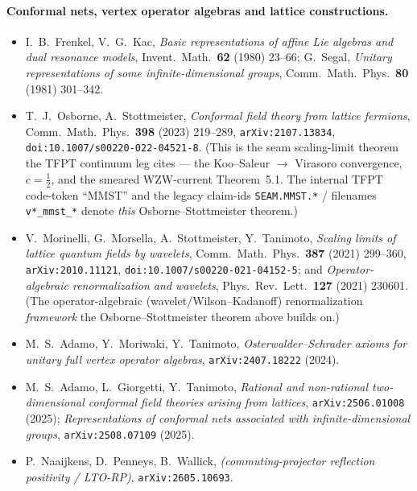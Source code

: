 \paragraph{Conformal nets, vertex operator algebras and lattice constructions.}
\begin{itemize}\setlength\itemsep{1.5pt}
\item I.~B.~Frenkel, V.~G.~Kac, \textit{Basic representations of affine Lie algebras and
  dual resonance models}, Invent.\ Math.\ \textbf{62} (1980) 23--66; G.~Segal,
  \textit{Unitary representations of some infinite-dimensional groups}, Comm.\ Math.\ Phys.\
  \textbf{80} (1981) 301--342.
\item T.~J.~Osborne, A.~Stottmeister, \textit{Conformal field theory from lattice
  fermions}, Comm.\ Math.\ Phys.\ \textbf{398} (2023) 219--289,
  \texttt{arXiv:2107.13834}, \texttt{doi:10.1007/s00220-022-04521-8}.  (This is the
  seam scaling-limit theorem the TFPT continuum leg cites --- the Koo--Saleur $\to$
  Virasoro convergence, $c=\tfrac12$, and the smeared WZW-current Theorem~5.1.  The
  internal TFPT code-token ``MMST'' and the legacy claim-ids \texttt{SEAM.MMST.*} /
  filenames \texttt{v*\_mmst\_*} denote \emph{this} Osborne--Stottmeister theorem.)
\item V.~Morinelli, G.~Morsella, A.~Stottmeister, Y.~Tanimoto, \textit{Scaling limits
  of lattice quantum fields by wavelets}, Comm.\ Math.\ Phys.\ \textbf{387} (2021)
  299--360, \texttt{arXiv:2010.11121}, \texttt{doi:10.1007/s00220-021-04152-5}; and
  \textit{Operator-algebraic renormalization and wavelets}, Phys.\ Rev.\ Lett.\
  \textbf{127} (2021) 230601.  (The operator-algebraic (wavelet/Wilson--Kadanoff)
  renormalization \emph{framework} the Osborne--Stottmeister theorem above builds on.)
\item M.~S.~Adamo, Y.~Moriwaki, Y.~Tanimoto, \textit{Osterwalder--Schrader axioms for
  unitary full vertex operator algebras}, \texttt{arXiv:2407.18222} (2024).
\item M.~S.~Adamo, L.~Giorgetti, Y.~Tanimoto, \textit{Rational and non-rational
  two-dimensional conformal field theories arising from lattices}, \texttt{arXiv:2506.01008}
  (2025); \textit{Representations of conformal nets associated with infinite-dimensional
  groups}, \texttt{arXiv:2508.07109} (2025).
\item P.~Naaijkens, D.~Penneys, B.~Wallick, \textit{(commuting-projector reflection
  positivity / LTO-RP)}, \texttt{arXiv:2605.10693}.
\end{itemize}

